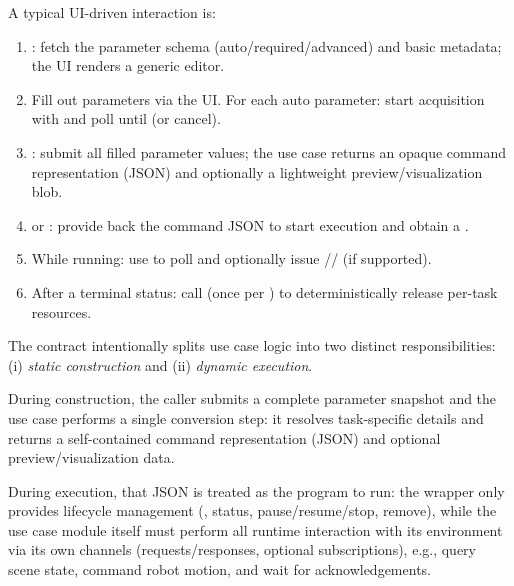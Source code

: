 
A typical UI-driven interaction is:
\begin{enumerate}
    \item {}: fetch the parameter schema (auto/\allowbreak required/\allowbreak advanced) and basic metadata; the UI renders a generic editor.
    \item Fill out parameters via the UI. For each auto  parameter: start acquisition with  and poll  until  (or cancel).
    \item {}: submit all filled parameter values; the use case returns an opaque command representation (JSON) and optionally a lightweight preview/visualization blob.
    \item {} or : provide back the command JSON to start execution and obtain a .
    \item While running: use  to poll  and optionally issue // (if supported).
    \item After a terminal status: call  (once per ) to deterministically release per-task resources.
\end{enumerate}


The contract intentionally splits use case logic into two distinct responsibilities:
(i) \emph{static construction} and (ii) \emph{dynamic execution}.

During construction, the caller submits a complete parameter snapshot and the use case performs a single conversion step: it resolves task-specific details and returns a self-contained command representation (JSON) and optional preview/visualization data.

During execution, that JSON is treated as the program to run: the wrapper only provides lifecycle management (, status, pause/resume/stop, remove), while the use case module itself must perform all runtime interaction with its environment via its own channels (requests/responses, optional subscriptions), e.g., query scene state, command robot motion, and wait for acknowledgements.

